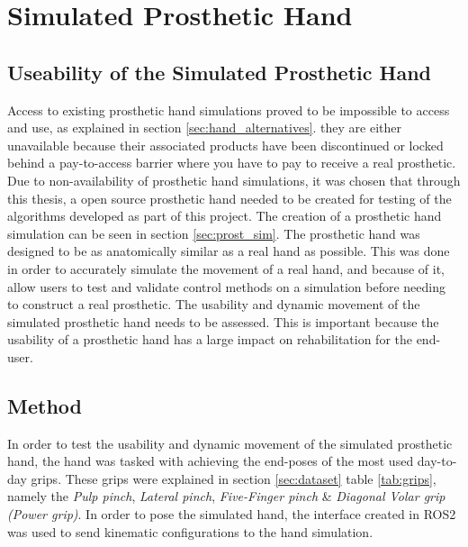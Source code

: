 \documentclass[../main.tex]{subfiles}
\begin{document}



\newpage
\section{Simulated Prosthetic Hand}
\label{sec:simtest}

\subsection{Useability of the Simulated Prosthetic Hand}

Access to existing prosthetic hand simulations proved to be impossible to access and use, as explained in section \ref{sec:hand_alternatives}. they are either unavailable because their associated products have been discontinued or locked behind a pay-to-access barrier where you have to pay to receive a real prosthetic.
Due to non-availability of prosthetic hand simulations, it was chosen that through this thesis, a open source prosthetic hand needed to be created for testing of the algorithms developed as part of this project.
The creation of a prosthetic hand simulation can be seen in section \ref{sec:prost_sim}.
The prosthetic hand was designed to be as anatomically similar as a real hand as possible.
This was done in order to accurately simulate the movement of a real hand, and because of it, allow users to test and validate control methods on a simulation before needing to construct a real prosthetic.
The usability and dynamic movement of the simulated prosthetic hand needs to be assessed.
This is important because the usability of a prosthetic hand has a large impact on rehabilitation for the end-user.

\subsection{Method}
In order to test the usability and dynamic movement of the simulated prosthetic hand, the hand was tasked with achieving the end-poses of the most used day-to-day grips.
These grips were explained in section \ref{sec:dataset} table \ref{tab:grips}, namely the \textit{Pulp pinch}, \textit{Lateral pinch}, \textit{Five-Finger pinch} \& \textit{Diagonal Volar grip (Power grip)}.
In order to pose the simulated hand, the interface created in ROS2 was used to send kinematic configurations to the hand simulation.
\end{document}
